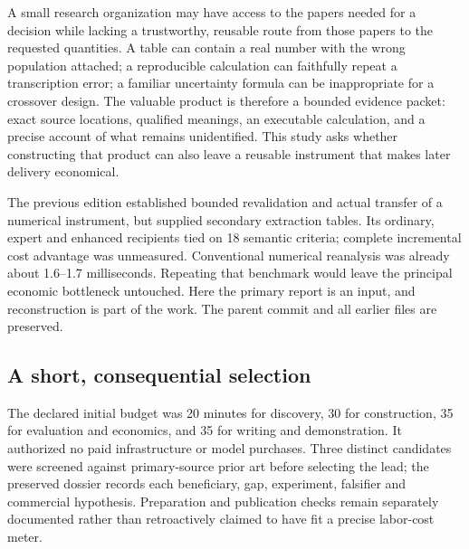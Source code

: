 A small research organization may have access to the papers needed for a decision while lacking a trustworthy, reusable route from those papers to the requested quantities. A table can contain a real number with the wrong population attached; a reproducible calculation can faithfully repeat a transcription error; a familiar uncertainty formula can be inappropriate for a crossover design. The valuable product is therefore a bounded evidence packet: exact source locations, qualified meanings, an executable calculation, and a precise account of what remains unidentified. This study asks whether constructing that product can also leave a reusable instrument that makes later delivery economical.

The previous edition established bounded revalidation and actual transfer of a numerical instrument, but supplied secondary extraction tables. Its ordinary, expert and enhanced recipients tied on 18 semantic criteria; complete incremental cost advantage was unmeasured. Conventional numerical reanalysis was already about 1.6--1.7 milliseconds. Repeating that benchmark would leave the principal economic bottleneck untouched. Here the primary report is an input, and reconstruction is part of the work. The parent commit and all earlier files are preserved.\citep{priorstudy}

\subsection{A short, consequential selection}

The declared initial budget was 20 minutes for discovery, 30 for construction, 35 for evaluation and economics, and 35 for writing and demonstration. It authorized no paid infrastructure or model purchases. Three distinct candidates were screened against primary-source prior art before selecting the lead; the preserved dossier records each beneficiary, gap, experiment, falsifier and commercial hypothesis. Preparation and publication checks remain separately documented rather than retroactively claimed to have fit a precise labor-cost meter.

